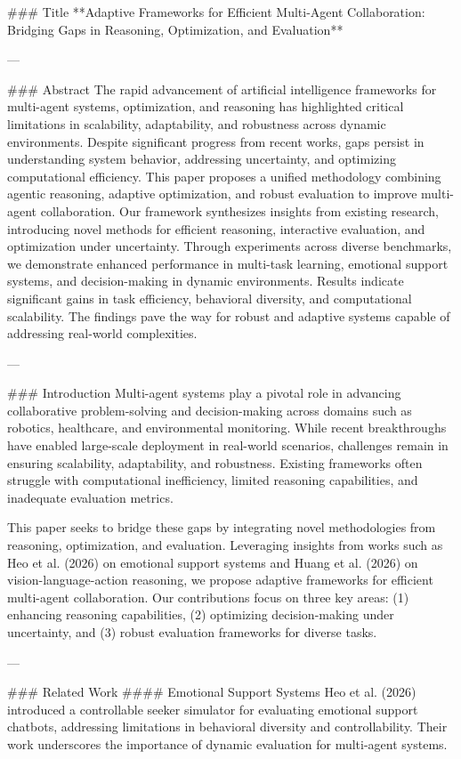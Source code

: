 ### Title  
**Adaptive Frameworks for Efficient Multi-Agent Collaboration: Bridging Gaps in Reasoning, Optimization, and Evaluation**

---

### Abstract  
The rapid advancement of artificial intelligence frameworks for multi-agent systems, optimization, and reasoning has highlighted critical limitations in scalability, adaptability, and robustness across dynamic environments. Despite significant progress from recent works, gaps persist in understanding system behavior, addressing uncertainty, and optimizing computational efficiency. This paper proposes a unified methodology combining agentic reasoning, adaptive optimization, and robust evaluation to improve multi-agent collaboration. Our framework synthesizes insights from existing research, introducing novel methods for efficient reasoning, interactive evaluation, and optimization under uncertainty. Through experiments across diverse benchmarks, we demonstrate enhanced performance in multi-task learning, emotional support systems, and decision-making in dynamic environments. Results indicate significant gains in task efficiency, behavioral diversity, and computational scalability. The findings pave the way for robust and adaptive systems capable of addressing real-world complexities.

---

### Introduction  
Multi-agent systems play a pivotal role in advancing collaborative problem-solving and decision-making across domains such as robotics, healthcare, and environmental monitoring. While recent breakthroughs have enabled large-scale deployment in real-world scenarios, challenges remain in ensuring scalability, adaptability, and robustness. Existing frameworks often struggle with computational inefficiency, limited reasoning capabilities, and inadequate evaluation metrics.

This paper seeks to bridge these gaps by integrating novel methodologies from reasoning, optimization, and evaluation. Leveraging insights from works such as Heo et al. (2026) on emotional support systems and Huang et al. (2026) on vision-language-action reasoning, we propose adaptive frameworks for efficient multi-agent collaboration. Our contributions focus on three key areas: (1) enhancing reasoning capabilities, (2) optimizing decision-making under uncertainty, and (3) robust evaluation frameworks for diverse tasks.

---

### Related Work  
#### Emotional Support Systems  
Heo et al. (2026) introduced a controllable seeker simulator for evaluating emotional support chatbots, addressing limitations in behavioral diversity and controllability. Their work underscores the importance of dynamic evaluation for multi-agent systems.

